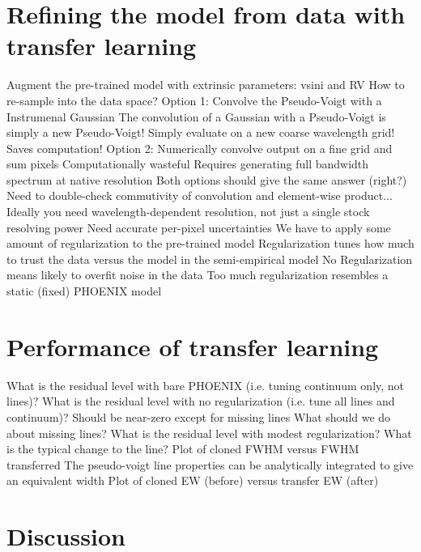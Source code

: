 \documentclass[modern]{aastex631}
\begin{document}
\section{Refining the model from data with transfer learning}
\begin{outline}
  \1 Augment the pre-trained model with extrinsic parameters:
  \2 vsini and RV
  \1 How to re-sample into the data space?
  \1 Option 1: Convolve the Pseudo-Voigt with a Instrumenal Gaussian
  \2 The convolution of a Gaussian with a Pseudo-Voigt is simply a new Pseudo-Voigt!
  \2 Simply evaluate on a new coarse wavelength grid!  Saves computation!
  \1 Option 2: Numerically convolve output on a fine grid and sum pixels
  \2 Computationally wasteful
  \2 Requires generating full bandwidth spectrum at native resolution
  \1 Both options should give the same answer (right?)
  \2 Need to double-check commutivity of convolution and element-wise product...
  \1 Ideally you need wavelength-dependent resolution, not just a single stock resolving power
  \1 Need accurate per-pixel uncertainties
  \1 We have to apply some amount of regularization to the pre-trained model
  \2 Regularization tunes how much to trust the data versus the model in the semi-empirical model
  \2 No Regularization means likely to overfit noise in the data
  \2 Too much regularization resembles a static (fixed) PHOENIX model
\end{outline}

\section{Performance of transfer learning}
\begin{outline}
  \1 What is the residual level with bare PHOENIX (i.e. tuning continuum only, not lines)?
  \1 What is the residual level with no regularization (i.e. tune all lines and continuum)?
  \2 Should be near-zero except for missing lines
  \2  What should we do about missing lines?
  \1 What is the residual level with modest regularization?  What is the typical change to the line?
  \2 Plot of cloned FWHM versus FWHM transferred
  \2 The pseudo-voigt line properties can be analytically integrated to give an equivalent width
  \2 Plot of cloned EW (before) versus transfer EW (after)
\end{outline}

\section{Discussion}
\end{document}
